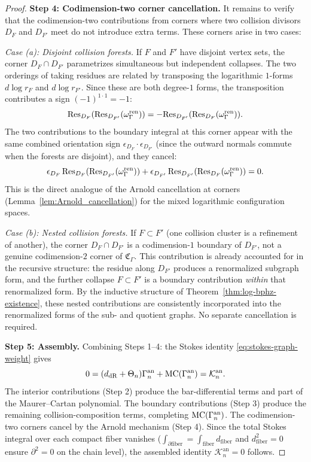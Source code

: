 \begin{proof}
\medskip
\textbf{Step 4: Codimension-two corner cancellation.}
It remains to verify that the codimension-two contributions from corners where two collision divisors $D_F$ and $D_{F'}$ meet do not introduce extra terms. These corners arise in two cases:

\emph{Case (a): Disjoint collision forests.} If $F$ and $F'$ have disjoint vertex sets, the corner $D_F \cap D_{F'}$ parametrizes simultaneous but independent collapses. The two orderings of taking residues are related by transposing the logarithmic $1$-forms $d\log r_F$ and $d\log r_{F'}$. Since these are both degree-$1$ forms, the transposition contributes a sign $(-1)^{1 \cdot 1} = -1$:
\[
 \mathrm{Res}_{D_F}(\mathrm{Res}_{D_{F'}}(\omega_\Gamma^{\mathrm{ren}}))
 = -\mathrm{Res}_{D_{F'}}(\mathrm{Res}_{D_F}(\omega_\Gamma^{\mathrm{ren}})).
\]
The two contributions to the boundary integral at this corner appear with the same combined orientation sign $\epsilon_{D_F} \cdot \epsilon_{D_{F'}}$ (since the outward normals commute when the forests are disjoint), and they cancel:
\[
 \epsilon_{D_F}\, \mathrm{Res}_{D_F}(\mathrm{Res}_{D_{F'}}(\omega_\Gamma^{\mathrm{ren}}))
 + \epsilon_{D_{F'}}\, \mathrm{Res}_{D_{F'}}(\mathrm{Res}_{D_F}(\omega_\Gamma^{\mathrm{ren}}))
 = 0.
\]
This is the direct analogue of the Arnold cancellation at corners (Lemma~\ref{lem:Arnold_cancellation}) for the mixed logarithmic configuration spaces.

\emph{Case (b): Nested collision forests.} If $F \subset F'$ (one collision cluster is a refinement of another), the corner $D_F \cap D_{F'}$ is a codimension-$1$ boundary of $D_{F'}$, not a genuine codimension-$2$ corner of $\mathfrak C_\Gamma$. This contribution is already accounted for in the recursive structure: the residue along $D_{F'}$ produces a renormalized subgraph form, and the further collapse $F \subset F'$ is a boundary contribution \emph{within} that renormalized form. By the inductive structure of Theorem~\ref{thm:log-bphz-existence}, these nested contributions are consistently incorporated into the renormalized forms of the sub- and quotient graphs. No separate cancellation is required.

\medskip
\textbf{Step 5: Assembly.}
Combining Steps 1--4: the Stokes identity \eqref{eq:stokes-graph-weight} gives
\[
 0 = (d_{\mathrm{dR}} + \Theta_n)\Gamma_n^{\mathrm{an}} + \mathrm{MC}(\Gamma_n^{\mathrm{an}}) = \mathcal K_n^{\mathrm{an}}.
\]
The interior contributions (Step 2) produce the bar-differential terms and part of the Maurer--Cartan polynomial. The boundary contributions (Step 3) produce the remaining collision-composition terms, completing $\mathrm{MC}(\Gamma_n^{\mathrm{an}})$. The codimension-two corners cancel by the Arnold mechanism (Step 4). Since the total Stokes integral over each compact fiber vanishes ($\int_{\partial \mathrm{fiber}} = \int_{\mathrm{fiber}} d_{\mathrm{fiber}}$ and $d_{\mathrm{fiber}}^2 = 0$ ensure $\partial^2 = 0$ on the chain level), the assembled identity $\mathcal K_n^{\mathrm{an}} = 0$ follows.
\end{proof}

